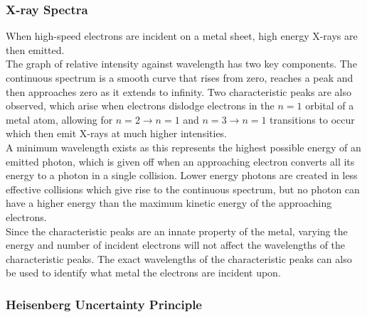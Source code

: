 \documentclass[../main]{subfiles}
\begin{document}


	\subsubsection{X-ray Spectra}

	When high-speed electrons are incident on a metal sheet, high energy X-rays are then emitted. \\

	The graph of relative intensity against wavelength has two key components. The continuous spectrum is a smooth curve that rises from zero, reaches a peak and then approaches zero as it extends to infinity. Two characteristic peaks are also observed, which arise when electrons dislodge electrons in the \(n=1\) orbital of a metal atom, allowing for \(n=2 \rightarrow n=1\) and \(n=3 \rightarrow n=1 \) transitions to occur which then emit X-rays at much higher intensities. \\

	A minimum wavelength exists as this represents the highest possible energy of an emitted photon, which is given off when an approaching electron converts all its energy to a photon in a single collision. Lower energy photons are created in less effective collisions which give rise to the continuous spectrum, but no photon can have a higher energy than the maximum kinetic energy of the approaching electrons. \\

	Since the characteristic peaks are an innate property of the metal, varying the energy and number of incident electrons will not affect the wavelengths of the characteristic peaks. The exact wavelengths of the characteristic peaks can also be used to identify what metal the electrons are incident upon.

	\subsubsection{Heisenberg Uncertainty Principle}
\end{document}
